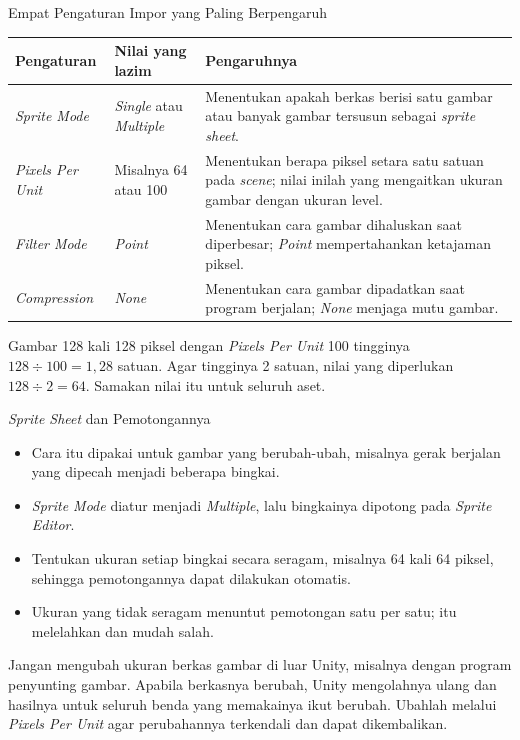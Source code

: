 \documentclass[aspectratio=169,10pt]{beamer}
\begin{document}
\begin{frame}{Empat Pengaturan Impor yang Paling Berpengaruh}
{\scriptsize
\renewcommand{\arraystretch}{1.14}
\begin{tabularx}{\textwidth}{@{}>{\raggedright\arraybackslash}p{2.9cm}
    >{\raggedright\arraybackslash}p{3.4cm}
    >{\raggedright\arraybackslash}X@{}}
\toprule
\textbf{Pengaturan} & \textbf{Nilai yang lazim} & \textbf{Pengaruhnya} \\
\midrule
\emph{Sprite Mode} &
  \emph{Single} atau \emph{Multiple} &
  Menentukan apakah berkas berisi satu gambar atau banyak gambar tersusun
  sebagai \emph{sprite sheet}. \\
\addlinespace
\emph{Pixels Per Unit} &
  Misalnya 64 atau 100 &
  Menentukan berapa piksel setara satu satuan pada \emph{scene}; nilai inilah
  yang mengaitkan ukuran gambar dengan ukuran level. \\
\addlinespace
\emph{Filter Mode} &
  \emph{Point} &
  Menentukan cara gambar dihaluskan saat diperbesar; \emph{Point}
  mempertahankan ketajaman piksel. \\
\addlinespace
\emph{Compression} &
  \emph{None} &
  Menentukan cara gambar dipadatkan saat program berjalan; \emph{None}
  menjaga mutu gambar. \\
\bottomrule
\end{tabularx}}
\vspace{0.10cm}
\begin{kotak}
Gambar 128 kali 128 piksel dengan \emph{Pixels Per Unit} 100 tingginya
$128 \div 100 = 1{,}28$ satuan. Agar tingginya 2 satuan, nilai yang diperlukan
$128 \div 2 = 64$. Samakan nilai itu untuk seluruh aset.
\end{kotak}
\end{frame}

\begin{frame}{\emph{Sprite Sheet} dan Pemotongannya}
\begin{itemize}
  \item Cara itu dipakai untuk gambar yang berubah-ubah, misalnya gerak
        berjalan yang dipecah menjadi beberapa bingkai.
  \item \emph{Sprite Mode} diatur menjadi \emph{Multiple}, lalu bingkainya
        dipotong pada \emph{Sprite Editor}.
  \item Tentukan ukuran setiap bingkai secara seragam, misalnya 64 kali 64
        piksel, sehingga pemotongannya dapat dilakukan otomatis.
  \item Ukuran yang tidak seragam menuntut pemotongan satu per satu; itu
        melelahkan dan mudah salah.
\end{itemize}
\vspace{0.12cm}
\begin{peringatan}
Jangan mengubah ukuran berkas gambar di luar Unity, misalnya dengan program
penyunting gambar. Apabila berkasnya berubah, Unity mengolahnya ulang dan
hasilnya untuk seluruh benda yang memakainya ikut berubah. Ubahlah melalui
\emph{Pixels Per Unit} agar perubahannya terkendali dan dapat dikembalikan.
\end{peringatan}
\end{frame}
\end{document}
